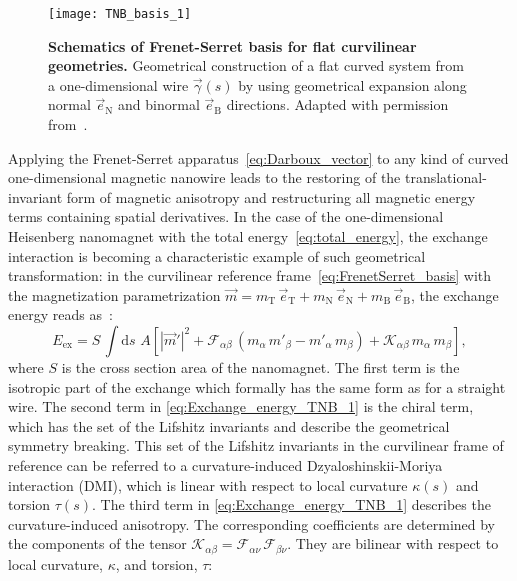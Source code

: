 \begin{figure}[t]
	\centering
	\texttt{[image: TNB\_basis\_1]}
	\caption{\label{fig:TNB}%
		\textbf{Schematics of Frenet-Serret basis for flat curvilinear geometries.} Geometrical construction of a flat curved system from a one-dimensional wire $\vec{\gamma}(s)$ by using geometrical expansion along normal $\vec{e}_\textrm{N}$ and binormal $\vec{e}_\textrm{B}$ directions. Adapted with permission from~\cite{Yershov18a}.
	}
\end{figure}

Applying the Frenet-Serret apparatus~\eqref{eq:Darboux_vector} to any kind of curved one-dimensional magnetic nanowire leads to the restoring of the translational-invariant form of magnetic anisotropy and restructuring all magnetic energy terms containing spatial derivatives. In the case of the one-dimensional Heisenberg nanomagnet with the total energy~\eqref{eq:total_energy}, the exchange interaction is becoming a characteristic example of such geometrical transformation: in the curvilinear reference frame~\eqref{eq:FrenetSerret_basis} with the magnetization parametrization $\vec{m} = m_\textrm{T}\,\vec{e}_\textrm{T} + m_\textrm{N}\,\vec{e}_\textrm{N} + m_\textrm{B}\,\vec{e}_\textrm{B}$, the exchange energy reads as~\cite{Sheka15}:
\begin{equation} \label{eq:Exchange_energy_TNB_1}
E_{\textrm{ex}} = S \, \int \textrm{d} s  \, \, A \left[ \left| \vec{m}' \right|^2 + \mathcal{F}_{\alpha \beta} \, ( m_{\alpha} \, m'_{\beta} - m'_{\alpha} \, m_{\beta} ) + \mathcal{K}_{\alpha \beta} \, m_{\alpha} \, m_{\beta} \right],
\end{equation}
where $S$ is the cross section area of the nanomagnet. The first term is the isotropic part of the exchange which formally  has the same form as for a straight wire. The second term in \eqref{eq:Exchange_energy_TNB_1} is the chiral term, which has the set of the Lifshitz invariants and describe the geometrical symmetry breaking. This set of the Lifshitz invariants in the curvilinear frame of reference can be referred to a curvature-induced Dzyaloshinskii-Moriya interaction (DMI), which is linear with respect to local curvature $\kappa(s)$ and torsion $\tau(s)$. The third term in \eqref{eq:Exchange_energy_TNB_1} describes the curvature-induced anisotropy. The corresponding coefficients are determined by the components of the tensor $\mathcal{K}_{\alpha \beta}= \mathcal{F}_{\alpha \nu} \, \mathcal{F}_{\beta \nu}$. They are bilinear with respect to local curvature, $\kappa$, and torsion, $\tau$:

